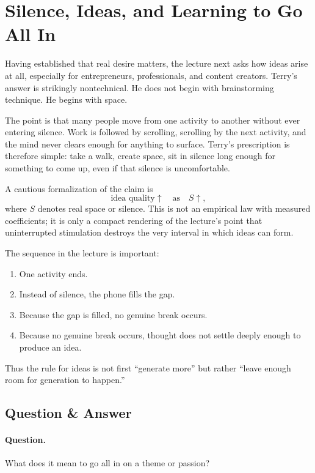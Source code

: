 \section{Silence, Ideas, and Learning to Go All In}

Having established that real desire matters, the lecture next asks how ideas arise at all, especially for entrepreneurs, professionals, and content creators. Terry's answer is strikingly nontechnical. He does not begin with brainstorming technique. He begins with space.

The point is that many people move from one activity to another without ever entering silence. Work is followed by scrolling, scrolling by the next activity, and the mind never clears enough for anything to surface. Terry's prescription is therefore simple: take a walk, create space, sit in silence long enough for something to come up, even if that silence is uncomfortable.

A cautious formalization of the claim is
\begin{equation}
\text{idea quality} \uparrow \quad \text{as} \quad S \uparrow,
\end{equation}
where \(S\) denotes real space or silence. This is not an empirical law with measured coefficients; it is only a compact rendering of the lecture's point that uninterrupted stimulation destroys the very interval in which ideas can form.

The sequence in the lecture is important:
\begin{enumerate}
\item One activity ends.
\item Instead of silence, the phone fills the gap.
\item Because the gap is filled, no genuine break occurs.
\item Because no genuine break occurs, thought does not settle deeply enough to produce an idea.
\end{enumerate}
Thus the rule for ideas is not first ``generate more'' but rather ``leave enough room for generation to happen.''

\subsection{Question \& Answer}

\paragraph{Question.} What does it mean to go all in on a theme or passion?

